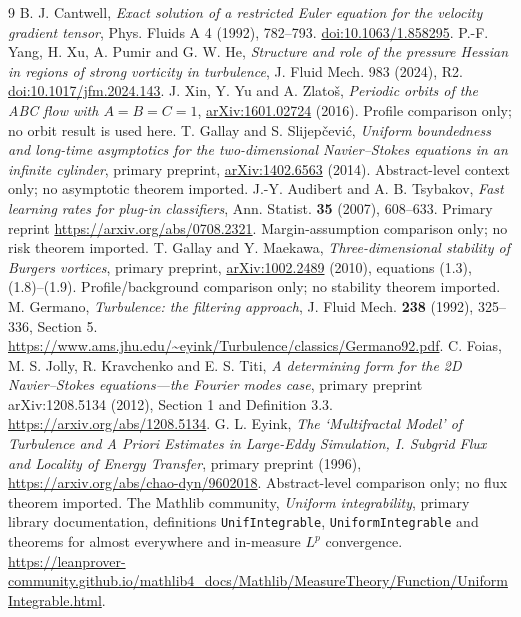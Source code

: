 \documentclass[11pt]{article}
\begin{document}
\begin{thebibliography}{9}
 B. J. Cantwell,
\emph{Exact solution of a restricted Euler equation for the velocity
gradient tensor}, Phys. Fluids A 4 (1992), 782--793.
\href{https://doi.org/10.1063/1.858295}{doi:10.1063/1.858295}.
 P.-F. Yang, H. Xu, A. Pumir and G. W. He,
\emph{Structure and role of the pressure Hessian in regions of strong
vorticity in turbulence}, J. Fluid Mech. 983 (2024), R2.
\href{https://doi.org/10.1017/jfm.2024.143}{doi:10.1017/jfm.2024.143}.
 J. Xin, Y. Yu and A. Zlato\v{s},
\emph{Periodic orbits of the ABC flow with $A=B=C=1$},
\href{https://arxiv.org/abs/1601.02724}{arXiv:1601.02724} (2016).
Profile comparison only; no orbit result is used here.
 T. Gallay and S. Slijep\v{c}evi\'c,
\emph{Uniform boundedness and long-time asymptotics for the two-dimensional
Navier--Stokes equations in an infinite cylinder}, primary preprint,
\href{https://arxiv.org/abs/1402.6563}{arXiv:1402.6563} (2014).
Abstract-level context only; no asymptotic theorem imported.
 J.-Y. Audibert and A. B. Tsybakov,
\emph{Fast learning rates for plug-in classifiers},
Ann. Statist. \textbf{35} (2007), 608--633.
Primary reprint \url{https://arxiv.org/abs/0708.2321}.
Margin-assumption comparison only; no risk theorem imported.
 T. Gallay and Y. Maekawa, \emph{Three-dimensional stability of Burgers vortices}, primary preprint, \href{https://arxiv.org/abs/1002.2489}{arXiv:1002.2489} (2010), equations (1.3), (1.8)--(1.9). Profile/background comparison only; no stability theorem imported.
 M. Germano, \emph{Turbulence: the filtering approach},
J. Fluid Mech. \textbf{238} (1992), 325--336, Section 5.
\url{https://www.ams.jhu.edu/~eyink/Turbulence/classics/Germano92.pdf}.
 C. Foias, M. S. Jolly, R. Kravchenko and E. S. Titi,
\emph{A determining form for the 2D Navier--Stokes equations---the Fourier modes case},
primary preprint arXiv:1208.5134 (2012), Section 1 and Definition 3.3.
\url{https://arxiv.org/abs/1208.5134}.
 G. L. Eyink,
\emph{The `Multifractal Model' of Turbulence and A Priori Estimates in
Large-Eddy Simulation, I. Subgrid Flux and Locality of Energy Transfer},
primary preprint (1996),
\url{https://arxiv.org/abs/chao-dyn/9602018}.
Abstract-level comparison only; no flux theorem imported.
 The Mathlib community,
\emph{Uniform integrability}, primary library documentation,
definitions \texttt{UnifIntegrable}, \texttt{UniformIntegrable} and
theorems for almost everywhere and in-measure $L^p$ convergence.
\url{https://leanprover-community.github.io/mathlib4_docs/Mathlib/MeasureTheory/Function/UniformIntegrable.html}.
\end{thebibliography}
\end{document}
